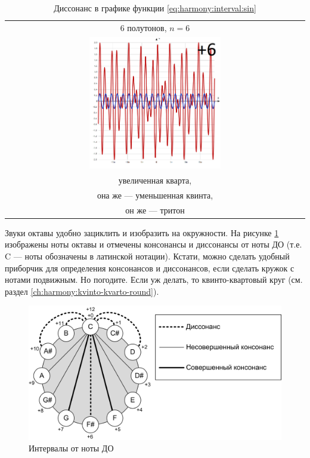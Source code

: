 \begin{table}[!ht]
    \caption{Диссонанс в графике функции \eqref{eq:harmony:interval:sin}}
    \label{t:harmony:interval:disso-6}
    \centering
    \begin{tabular}{c}
        \hline\hline
        6 полутонов, $n=6$ \\
        \includegraphics[width=0.45\textwidth]{fig/intervals/i06} \\
        увеличенная кварта,\\
        она же --- уменьшенная квинта,\\
        он же --- тритон\\
        \hline\hline
    \end{tabular}
\end{table}

Звуки октавы удобно зациклить и изобразить на окружности. На рисунке \ref{fig:harmony:interval:oct-round} изображены ноты октавы и отмечены консонансы и диссонансы от ноты ДО (т.е. C --- ноты обозначены в латинской нотации). Кстати, можно сделать удобный приборчик для определения консонансов и диссонансов, если сделать кружок с нотами подвижным. Но погодите. Если уж делать, то квинто-квартовый круг (см. раздел \ref{ch:harmony:kvinto-kvarto-round}).

\begin{figure}[!ht]
    \centering
    \includegraphics[width=\textwidth]{fig/intervals/octave-round} 
    \caption{Интервалы от ноты ДО}\label{fig:harmony:interval:oct-round}
\end{figure} 

